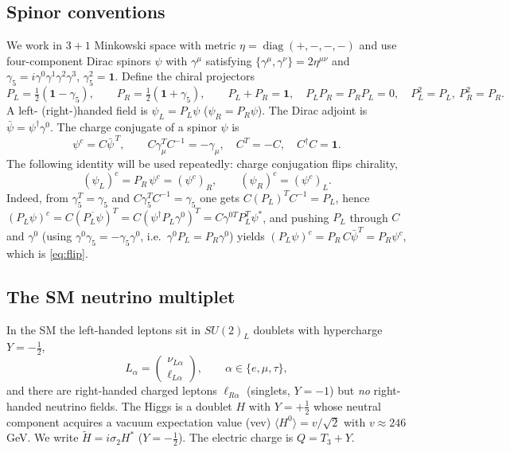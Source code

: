 \documentclass[12pt]{article}
\theoremstyle{definition}
\newcommand{\PL}{P_L}
\newcommand{\PR}{P_R}
\begin{document}
\subsection{Spinor conventions}
We work in $3+1$ Minkowski space with metric
$\eta=\operatorname{diag}(+,-,-,-)$ and use four-component Dirac spinors
$\psi$ with $\gamma^\mu$ satisfying
$\{\gamma^\mu,\gamma^\nu\}=2\eta^{\mu\nu}$ and
$\gamma_5 = i\gamma^0\gamma^1\gamma^2\gamma^3$, $\gamma_5^2=\mathbf 1$.
Define the chiral projectors
\begin{equation}\label{eq:proj}
\PL=\tfrac12(\mathbf 1-\gamma_5),\qquad
\PR=\tfrac12(\mathbf 1+\gamma_5),\qquad
\PL+\PR=\mathbf 1,\quad \PL\PR=\PR\PL=0,\quad \PL^2=\PL,\ \PR^2=\PR.
\end{equation}
A left- (right-)handed field is $\psi_L=\PL\psi$ ($\psi_R=\PR\psi$).
The Dirac adjoint is $\bar\psi=\psi^\dagger\gamma^0$. The charge
conjugate of a spinor $\psi$ is
\begin{equation}\label{eq:cc}
\psi^c = C\bar\psi^{\,T}, \qquad
C\gamma_\mu^T C^{-1}=-\gamma_\mu,\quad C^T=-C,\quad C^\dagger C=\mathbf 1 .
\end{equation}
The following identity will be used repeatedly: charge conjugation flips
chirality,
\begin{equation}\label{eq:flip}
(\psi_L)^c=\PR\,\psi^c=(\psi^c)_R,\qquad (\psi_R)^c=(\psi^c)_L .
\end{equation}
Indeed, from $\gamma_5^T=\gamma_5$ and
$C\gamma_5^TC^{-1}=\gamma_5$ one gets
$C(\PL)^TC^{-1}=\PL$, hence
$(\PL\psi)^c=C(\overline{\PL\psi})^T
=C(\psi^\dagger\PL\gamma^0)^{T}
=C\gamma^{0T}\PL^T\psi^{*}$, and pushing $\PL$ through $C$ and $\gamma^0$
(using $\gamma^0\gamma_5=-\gamma_5\gamma^0$, i.e.\ $\gamma^0\PL=\PR\gamma^0$)
yields $(\PL\psi)^c=\PR\,C\bar\psi^T=\PR\psi^c$, which is
\eqref{eq:flip}.

\subsection{The SM neutrino multiplet}
In the SM the left-handed leptons sit in $SU(2)_L$ doublets with
hypercharge $Y=-\tfrac12$,
\begin{equation}\label{eq:doublet}
L_\alpha=\begin{pmatrix}\nu_{L\alpha}\\ \ell_{L\alpha}\end{pmatrix},
\qquad \alpha\in\{e,\mu,\tau\},
\end{equation}
and there are right-handed charged leptons
$\ell_{R\alpha}$ (singlets, $Y=-1$) but \emph{no} right-handed neutrino
fields. The Higgs is a doublet
$H$ with $Y=+\tfrac12$ whose neutral component acquires a vacuum
expectation value (vev) $\langle H^0\rangle=v/\sqrt2$ with
$v\approx246$ GeV. We write
$\widetilde H=i\sigma_2 H^*$ ($Y=-\tfrac12$). The electric charge is
$Q=T_3+Y$.
\end{document}
